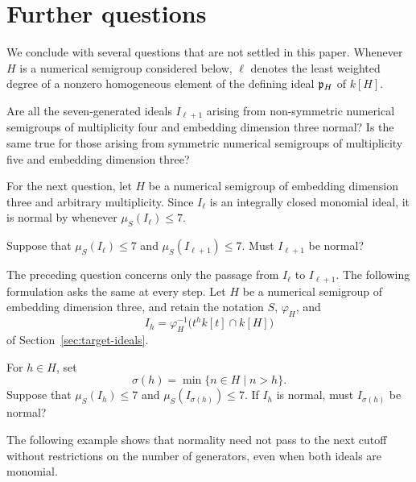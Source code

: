 \section{Further questions}
\label{sec:further-questions}

We conclude with several questions that are not settled in this paper.
Whenever $H$ is a numerical semigroup considered below, $\ell$ denotes the
least weighted degree of a nonzero homogeneous element of the defining ideal
$\mathfrak{p}_H$ of $k[H]$.

\begin{question}
\label{que:seven-from-semigroups}
	Are all the seven-generated ideals $I_{\ell+1}$ arising
	from non-symmetric numerical semigroups of multiplicity four and embedding
	dimension three normal?  Is the same true for those arising from symmetric
	numerical semigroups of multiplicity five and embedding dimension three?
\end{question}

For the next question, let $H$ be a numerical
semigroup of embedding dimension three and arbitrary multiplicity.  Since
$I_\ell$ is an integrally closed monomial ideal, it is normal by
\cite[Theorem~3.1]{AtakaMatsuoka2026} whenever $\mu_S(I_\ell)\leq7$.

\begin{question}
	Suppose that $\mu_S(I_\ell)\leq7$ and
	$\mu_S(I_{\ell+1})\leq7$.  Must $I_{\ell+1}$ be normal?
\end{question}

The preceding question concerns only the passage from $I_\ell$ to
$I_{\ell+1}$.  The following formulation asks the same at every step.
Let $H$ be a numerical semigroup of embedding dimension three, and retain
the notation $S$, $\varphi_H$, and
\[
 I_h=\varphi_H^{-1}\bigl(t^hk[t]\cap k[H]\bigr)
\]
of Section~\ref{sec:target-ideals}.

\begin{question}
\label{que:successive-degree-bounds}
For $h\in H$, set
\[
 \sigma(h)=\min\{n\in H\mid n>h\}.
\]
Suppose that $\mu_S(I_h)\leq7$ and $\mu_S(I_{\sigma(h)})\leq7$.
If $I_h$ is normal, must $I_{\sigma(h)}$ be normal?
\end{question}

The following example shows that normality need not pass to the next
cutoff without restrictions on the number of generators, even when both
ideals are monomial.

